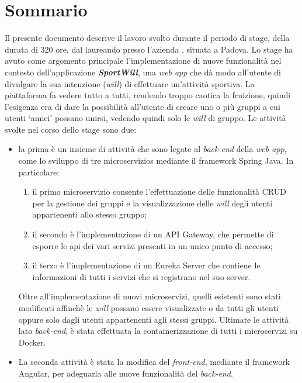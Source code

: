 
\cleardoublepage
{}
{}
\begingroup
\let\clearpage\relax
\let\cleardoublepage\relax
\let\cleardoublepage\relax

\chapter*{Sommario}

Il presente documento descrive il lavoro svolto durante il periodo di stage, della durata di 320 ore, dal laureando \myName presso
 l'azienda \myCompany, situata a Padova.
Lo stage ha avuto come argomento principale l'implementazione di nuove funzionalità nel contesto dell'applicazione \textbf{\textit{SportWill}}, una
\textit{web app} che dà modo all'utente di divulgare la sua intenzione (\textit{will}) di effettuare un'attività sportiva.
La piattaforma fa vedere tutto a tutti, rendendo troppo caotica la fruizione, quindi l'esigenza era di dare la possibilità all'utente 
di creare uno o più gruppi a cui utenti \enquote*{amici} possano unirsi, vedendo quindi solo le \textit{will} di gruppo.
Le attività svolte nel corso dello stage sono due:
\begin{itemize}
    \item la prima è un insieme di attività che sono legate al \textit{back-end} della \textit{web app}, come lo sviluppo di tre \glspl{microservizio} mediante il \gls{framework} \gls{Spring} Java. 
    In particolare: 
        \begin{enumerate}
            \item il primo microservizio consente l'effettuazione delle funzionalità \gls{CRUD} per la gestione dei gruppi e la visualizzazione delle \textit{will} 
            degli utenti appartenenti allo stesso gruppo;
            \item il secondo è l'implementazione di un \gls{API Gateway}, che permette di esporre le \gls{api} dei vari servizi presenti in un 
            unico punto di accesso;
            \item il terzo è l'implementazione di un \gls{Eureka Server} che contiene le informazioni di tutti i servizi che si registrano nel suo server.
        \end{enumerate}
    Oltre all'implementazione di nuovi microservizi, quelli esistenti sono stati modificati affinchè le \textit{will} possano
    essere visualizzate o da tutti gli utenti oppure solo dagli utenti appartenenti agli stessi gruppi. 
    Ultimate le attività lato \textit{back-end}, è stata effettuata la \gls{containerizzazione} di tutti i microservizi su Docker.
    \item La seconda attività è stata la modifica del \textit{front-end}, mediante il framework \gls{Angular}, per adeguarla alle nuove funzionalità del \textit{back-end}.
\end{itemize}
